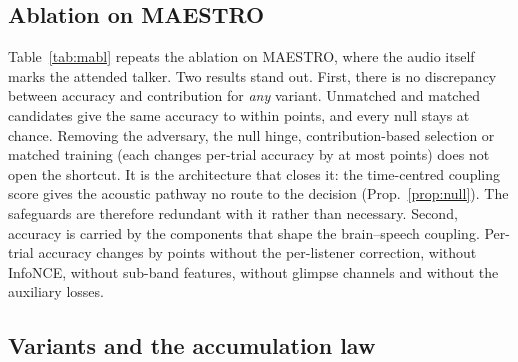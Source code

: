\documentclass[10pt,twocolumn,letterpaper]{article}
\begin{document}
\FloatBarrier
\subsection{Ablation on MAESTRO}\label{app:mabl}
Table~\ref{tab:mabl} repeats the ablation on
MAESTRO, where the audio itself marks the attended talker. Two results stand out. First,
there is no discrepancy between accuracy and contribution for \emph{any} variant. Unmatched
and matched candidates give the same accuracy to within \maUnmatchedGap{} points, and every
null stays at chance. Removing the adversary, the null hinge, contribution-based selection or
matched training (each changes per-trial accuracy by at most \maSafeMax{} points) does not
open the shortcut. It is the architecture that closes it: the time-centred coupling score
gives the acoustic pathway no route to the decision (Prop.~\ref{prop:null}). The safeguards
are therefore redundant with it rather than necessary. Second, accuracy is carried by the
components that shape the brain--speech coupling. Per-trial accuracy changes by
\maAblRank{} points without the per-listener correction, \maAblNce{} without InfoNCE,
\maAblBanks{} without sub-band features, \maAblGlimpse{} without glimpse channels and
\maAblAux{} without the auxiliary losses.
\begin{table}[h]\centering\small
\caption{Ablation on MAESTRO, where the audio offers a shortcut (the attended talker is always
the loudest): within listeners, seed 0, 4-way. For each variant: 5-s accuracy and
contribution with unmatched candidates (shortcut available) and with matched candidates;
the EEG-shuffle and circular-shift nulls; per-trial accuracy and contribution; and embedding
collapse (mean cosine between windows; 1 = every window alike).}\label{tab:mabl}
\resizebox{\textwidth}{!}{}
\end{table}

\FloatBarrier
\subsection{Variants and the accumulation law}\label{app:lawdetails}
\end{document}

